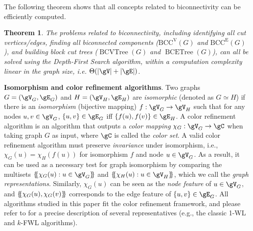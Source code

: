 \documentclass{article}
\let\cref\crtcref
\newtheorem{theorem}{Theorem}[section]
\newcommand*{\ldblbrace}{\{\mskip-5mu\{}
\newcommand*{\rdblbrace}{\}\mskip-5mu\}}
\begin{document}
The following theorem shows that all concepts related to biconnectivity can be efficiently computed.

\begin{theorem}
\label{thm:tarjan}
 The problems related to biconnectivity, including identifying all cut vertices/edges, finding all biconnected components ($\mathrm{BCC}^\mathrm{V}(G)$ and $\mathrm{BCC}^\mathrm{E}(G)$), and building block cut trees ($\operatorname{BCVTree}(G)$ and $\operatorname{BCETree}(G)$), can all be solved using the Depth-First Search algorithm, within a computation complexity linear in the graph size, i.e. $\Theta(|\gV|+|\gE|)$.
\end{theorem}

\vspace{-4pt}

\textbf{Isomorphism and color refinement algorithms}. Two graphs $G=(\gV_G,\gE_G)$ and $H=(\gV_H,\gE_H)$ are \emph{isomorphic} (denoted as $G\simeq H$) if there is an \emph{isomorphism} (bijective mapping) $f:\gV_G\to\gV_H$ such that for any nodes $u,v\in\gV_G$, $\{u,v\}\in\gE_G$ iff $\{f(u),f(v)\}\in\gE_H$. A color refinement algorithm is an algorithm that outputs a \emph{color mapping} $\chi_G:\gV_G\to\gC$ when taking graph $G$ as input, where $\gC$ is called the \emph{color set}. A valid color refinement algorithm must preserve \emph{invariance} under isomorphism, i.e., $\chi_G(u)=\chi_H(f(u))$ for isomorphism $f$ and node $u\in\gV_G$. As a result, it can be used as a necessary test for graph isomorphism by comparing the multisets $\ldblbrace \chi_G(u):u\in\gV_G\rdblbrace$ and $\ldblbrace \chi_H(u):u\in\gV_H\rdblbrace$, which we call the \emph{graph representations}. Similarly, $\chi_G(u)$ can be seen as the \emph{node feature} of $u\in\gV_G$, and $\ldblbrace \chi_G(u),\chi_G(v)\rdblbrace$ corresponds to the {edge feature} of $\{u,v\}\in\gE_G$. All algorithms studied in this paper fit the color refinement framework, and please refer to \cref{sec:algorithms} for a precise description of several representatives (e.g., the classic 1-WL and $k$-FWL algorithms).
\end{document}
